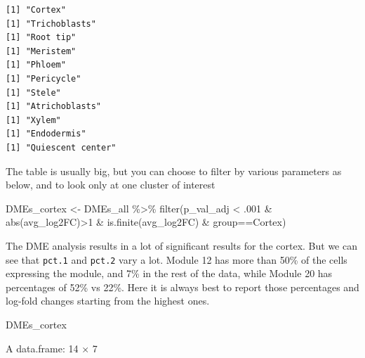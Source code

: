\documentclass[
  letterpaper,
  DIV=11,
  numbers=noendperiod]{scrartcl}
\newenvironment{Shaded}{}{}
\newcommand{\DecValTok}[1]{\textcolor[rgb]{0.25,0.63,0.44}{#1}}
\newcommand{\FunctionTok}[1]{\textcolor[rgb]{0.02,0.16,0.49}{#1}}
\newcommand{\NormalTok}[1]{#1}
\newcommand{\OtherTok}[1]{\textcolor[rgb]{0.00,0.44,0.13}{#1}}
\newcommand{\SpecialCharTok}[1]{\textcolor[rgb]{0.25,0.44,0.63}{#1}}
\newcommand{\StringTok}[1]{\textcolor[rgb]{0.25,0.44,0.63}{#1}}
\begin{document}
\begin{verbatim}
[1] "Cortex"
[1] "Trichoblasts"
[1] "Root tip"
[1] "Meristem"
[1] "Phloem"
[1] "Pericycle"
[1] "Stele"
[1] "Atrichoblasts"
[1] "Xylem"
[1] "Endodermis"
[1] "Quiescent center"
\end{verbatim}

The table is usually big, but you can choose to filter by various
parameters as below, and to look only at one cluster of interest

\begin{Shaded}
\begin{Highlighting}[]
\NormalTok{DMEs\_cortex }\OtherTok{\textless{}{-}}\NormalTok{ DMEs\_all }\SpecialCharTok{\%\textgreater{}\%} \FunctionTok{filter}\NormalTok{(p\_val\_adj }\SpecialCharTok{\textless{}}\NormalTok{ .}\DecValTok{001} \SpecialCharTok{\&} \FunctionTok{abs}\NormalTok{(avg\_log2FC)}\SpecialCharTok{\textgreater{}}\DecValTok{1} 
                                       \SpecialCharTok{\&} \FunctionTok{is.finite}\NormalTok{(avg\_log2FC)}
                                       \SpecialCharTok{\&}\NormalTok{ group}\SpecialCharTok{==}\StringTok{\textquotesingle{}Cortex\textquotesingle{}}\NormalTok{)}
\end{Highlighting}
\end{Shaded}

The DME analysis results in a lot of significant results for the cortex.
But we can see that \texttt{pct.1} and \texttt{pct.2} vary a lot. Module
12 has more than 50\% of the cells expressing the module, and 7\% in the
rest of the data, while Module 20 has percentages of 52\% vs 22\%. Here
it is always best to report those percentages and log-fold changes
starting from the highest ones.

\begin{Shaded}
\begin{Highlighting}[]
\NormalTok{DMEs\_cortex}
\end{Highlighting}
\end{Shaded}

A data.frame: 14 × 7
\end{document}
